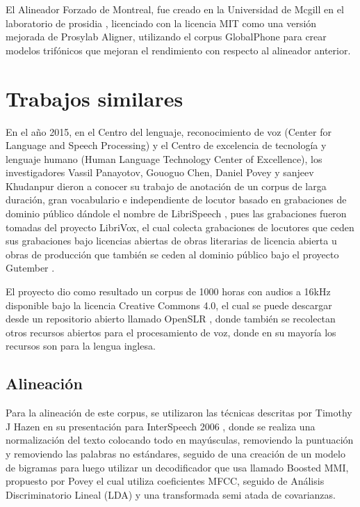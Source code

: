 El Alineador Forzado de Montreal, fue creado en la Universidad de Mcgill en el laboratorio de prosidia \cite{McAuliffe2017MontrealKaldi}, licenciado con la licencia MIT  como una versión mejorada de Prosylab Aligner, utilizando el corpus GlobalPhone  para crear modelos trifónicos que mejoran el rendimiento con respecto al alineador anterior.

\section{Trabajos similares}

En el año 2015, en el Centro del lenguaje, reconocimiento de voz (Center for Language and Speech Processing) y el Centro de excelencia de tecnología y lenguaje humano (Human Language Technology Center of Excellence), los investigadores Vassil Panayotov, Gouoguo Chen, Daniel Povey y sanjeev Khudanpur dieron a conocer su trabajo de anotación de un corpus de larga duración, gran vocabulario e independiente de locutor basado en grabaciones de dominio público dándole el nombre de LibriSpeech \cite{PanayotovLIBRISPEECH:BOOKS}, pues las grabaciones fueron tomadas del proyecto LibriVox, el cual colecta grabaciones de locutores que ceden sus grabaciones bajo licencias abiertas de obras literarias de licencia abierta u obras de producción que también se ceden al dominio público bajo el proyecto Gutember \cite{gutenberg}.

El proyecto dio como resultado un corpus de 1000 horas con audios a 16kHz disponible bajo la licencia Creative Commons 4.0, el cual se puede descargar desde un repositorio abierto llamado OpenSLR \cite{openSLR}, donde también se recolectan otros recursos abiertos para el procesamiento de voz, donde en su mayoría los recursos son para la lengua inglesa.

\subsection{Alineación}

Para la alineación de este corpus, se utilizaron las técnicas descritas por Timothy J Hazen en su presentación para InterSpeech 2006 \cite{HazenAutomatic}, donde se realiza una normalización del texto colocando todo en mayúsculas, removiendo la puntuación y removiendo las palabras no estándares, seguido de una creación de un modelo de bigramas para luego utilizar un decodificador que usa llamado Boosted MMI, propuesto por Povey \cite{PoveyBOOSTEDTRAINING} el cual utiliza coeficientes MFCC, seguido de Análisis Discriminatorio Lineal (LDA) y una transformada semi atada de covarianzas.

